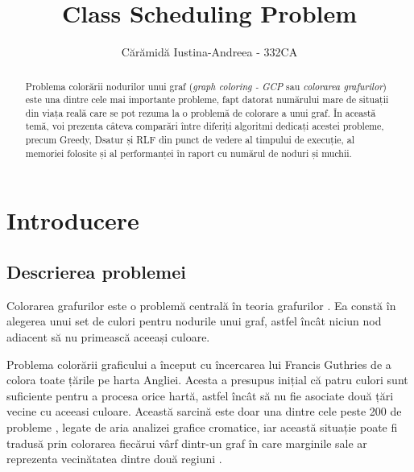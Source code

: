 \documentclass[runningheads]{paper}
\begin{document}
%
\title{Class Scheduling Problem}
%
\author{Cărămidă Iustina-Andreea - 332CA}
%
%
\maketitle              %
%
\begin{abstract}
    Problema colorării nodurilor unui graf (\textit{graph coloring - GCP} sau \textit{colorarea grafurilor})
    este una dintre cele mai importante probleme, fapt datorat numărului mare de situații din viața reală
    care se pot rezuma la o problemă de colorare a unui graf. În această temă, voi prezenta câteva comparări 
    între diferiți algoritmi dedicați acestei probleme, precum Greedy, Dsatur și RLF din 
    punct de vedere al timpului de execuție, al memoriei folosite și al performanței în raport cu numărul 
    de noduri și muchii.


\end{abstract}


\section{Introducere}
\subsection{Descrierea problemei}

\quad Colorarea grafurilor este o problemă centrală în teoria grafurilor \cite{1}. Ea 
constă în alegerea unui set de culori pentru nodurile unui graf, astfel încât 
niciun nod adiacent să nu primească aceeași culoare.

Problema colorării graficului a început cu încercarea lui 
Francis Guthries de a colora toate țările pe harta Angliei. 
Acesta a presupus inițial că patru culori sunt suficiente pentru a procesa orice 
hartă, astfel încât să nu fie asociate două țări vecine
cu aceeasi culoare. Această sarcină este doar una dintre cele peste 200 de probleme
\cite{2}, legate de aria analizei grafice cromatice,
iar această situație poate fi tradusă prin colorarea fiecărui vârf
dintr-un graf în care marginile sale ar reprezenta vecinătatea
dintre două regiuni \cite{3}.
\end{document}
